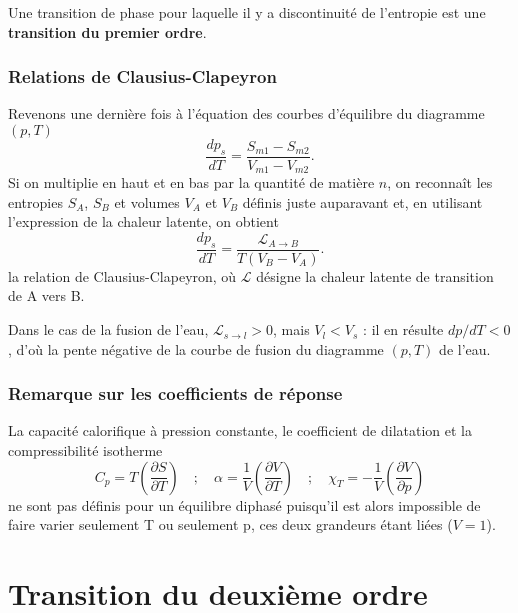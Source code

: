 \documentclass[11pt,a4paper]{report}
\begin{document}
Une transition de phase pour laquelle il y a discontinuité de l'entropie est une \textbf{transition du premier ordre}.

\subsubsection*{Relations de Clausius-Clapeyron}

Revenons une dernière fois à l'équation des courbes d'équilibre du diagramme $(p,T)$
\begin{equation}
	\frac{dp_s}{dT} = \frac{S_{m1} - S_{m2}}{V_{m1} - V_{m2}}.
	\label{eq_protoclapeyron}
\end{equation}
Si on multiplie en haut et en bas par la quantité de matière $n$, on reconnaît les entropies $S_A$, $S_B$ et volumes $V_A$ et $V_B$ définis juste auparavant et, en utilisant l'expression de la chaleur latente, on obtient
\begin{equation}
	\boxed{\frac{dp_s}{dT} 
	= \frac{\mathcal{L}_{A\rightarrow B}}{T\left(V_B-V_A\right)}}.	
\end{equation}
la relation de Clausius-Clapeyron, où $\mathcal{L}$ désigne la chaleur latente de transition de A vers B.

Dans le cas de la fusion de l'eau, $\mathcal{L}_{s\rightarrow l} > 0$, mais $V_l < V_s$ : il en résulte $dp/dT < 0$, d'où la pente négative de la courbe de fusion du diagramme $(p,T)$ de l'eau.

\subsubsection*{Remarque sur les coefficients de réponse}

La capacité calorifique à pression constante, le coefficient de dilatation et la compressibilité isotherme 
\begin{equation}
	C_p = T\left(\frac{\partial S}{\partial T}\right)\quad;\quad
	\alpha = \frac{1}{V}\left(\frac{\partial V}{\partial T}\right)\quad;\quad
	\chi_T = - \frac{1}{V}\left(\frac{\partial V}{\partial p}\right)
\end{equation}
ne sont pas définis pour un équilibre diphasé puisqu'il est alors impossible de faire varier seulement T ou seulement p, ces deux grandeurs étant liées ($V = 1$).

\section{Transition du deuxième ordre}
\end{document}
